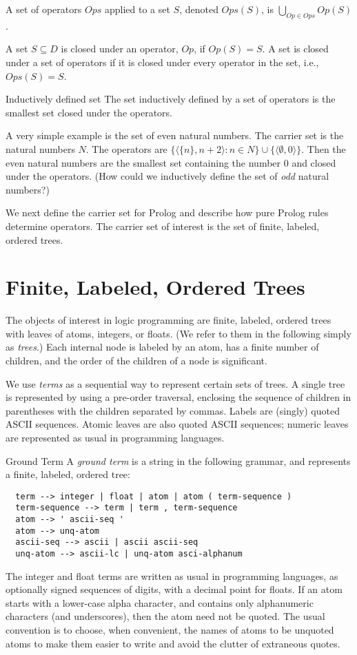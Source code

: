A set of operators $Ops$ applied to a set $S$, denoted $Ops(S)$, is
$\bigcup_{Op\in Ops} Op(S)$.

A set $S \subseteq D$ is closed under an operator, $Op$, if $Op(S)=S$.
A set is closed under a set of operators if it is closed under every
operator in the set, i.e., $Ops(S)=S$.

\begin{definition}{Inductively defined set}
The set inductively defined by a set of operators is the smallest set
closed under the operators.
\end{definition}

A very simple example is the set of even natural numbers.  The carrier
set is the natural numbers $N$.  The operators are $\{\langle \{n\},
n+2\rangle: n \in N\} \cup \{\langle \emptyset, 0 \rangle\}$.  Then
the even natural numbers are the smallest set containing the number
$0$ and closed under the operators.  (How could we inductively define
the set of {\em odd} natural numbers?)

We next define the carrier set for Prolog and describe how pure Prolog
rules determine operators.  The carrier set of interest is the set of
finite, labeled, ordered trees.

\section{Finite, Labeled, Ordered Trees}
\label{trees}
The objects of interest in logic programming are finite, labeled,
ordered trees with leaves of atoms, integers, or floats. (We refer to
them in the following simply as {\em trees}.)  Each internal node is
labeled by an atom, has a finite number of children, and the order of
the children of a node is significant.

We use {\em terms} as a sequential way to represent certain sets of
trees.  A single tree is represented by using a pre-order
traversal, enclosing the sequence of children in parentheses with the
children separated by commas.  Labels are (singly) quoted ASCII
sequences.  Atomic leaves are also quoted ASCII sequences; numeric
leaves are represented as usual in programming languages.

\begin{definition}{Ground Term}
    A {\em ground term} is a string in the following grammar, and
    represents a finite, labeled, ordered tree:
\begin{verbatim}
  term --> integer | float | atom | atom ( term-sequence )
  term-sequence --> term | term , term-sequence
  atom --> ' ascii-seq '
  atom --> unq-atom
  ascii-seq --> ascii | ascii ascii-seq
  unq-atom --> ascii-lc | unq-atom asci-alphanum
\end{verbatim}
The integer and float terms are written as usual in programming
languages, as optionally signed sequences of digits, with a decimal
point for floats.  If an atom starts with a lower-case alpha
character, and contains only alphanumeric characters (and
underscores), then the atom need not be quoted.  The usual convention
is to choose, when convenient, the names of atoms to be unquoted atoms
to make them easier to write and avoid the clutter of extraneous
quotes.
\end{definition}


